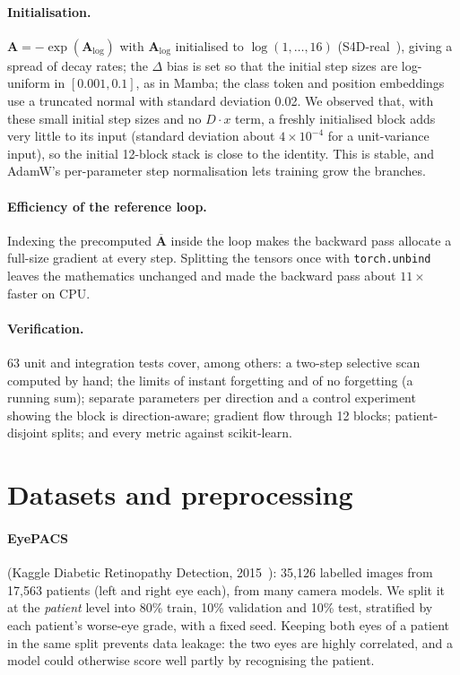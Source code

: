 \documentclass[11pt,a4paper]{article}
\begin{document}
\paragraph{Initialisation.} $\mathbf{A}=-\exp(\mathbf{A}_{\log})$ with
$\mathbf{A}_{\log}$ initialised to $\log(1,\dots,16)$ (S4D-real~\cite{gu2022s4d}),
giving a spread of decay rates; the $\Delta$ bias is set so that the initial step
sizes are log-uniform in $[0.001, 0.1]$, as in Mamba; the class token and position
embeddings use a truncated normal with standard deviation 0.02.
We observed that, with these small initial step sizes and no $D\cdot x$ term, a
freshly initialised block adds very little to its input (standard deviation about
$4\times10^{-4}$ for a unit-variance input), so the initial 12-block stack is close
to the identity. This is stable, and AdamW's per-parameter step normalisation lets
training grow the branches.

\paragraph{Efficiency of the reference loop.} Indexing the precomputed
$\overline{\mathbf{A}}$ inside the loop makes the backward pass allocate a full-size
gradient at every step. Splitting the tensors once with \texttt{torch.unbind}
leaves the mathematics unchanged and made the backward pass about $11\times$ faster
on CPU.

\paragraph{Verification.} 63 unit and integration tests cover, among others: a
two-step selective scan computed by hand; the limits of instant forgetting and of
no forgetting (a running sum); separate parameters per direction and a control
experiment showing the block is direction-aware; gradient flow through 12 blocks;
patient-disjoint splits; and every metric against scikit-learn.

\section{Datasets and preprocessing}

\paragraph{EyePACS} (Kaggle Diabetic Retinopathy Detection, 2015~\cite{eyepacs2015}):
35,126 labelled images from 17,563 patients (left and right eye each), from many
camera models. We split it at the \emph{patient} level into 80\% train, 10\%
validation and 10\% test, stratified by each patient's worse-eye grade, with a fixed
seed. Keeping both eyes of a patient in the same split prevents data leakage: the
two eyes are highly correlated, and a model could otherwise score well partly by
recognising the patient.
\end{document}
